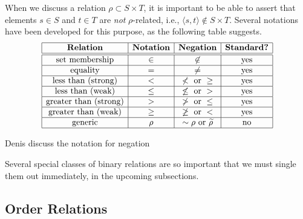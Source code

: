 \bigskip

\noindent {}
\bigskip

\noindent
When we discuss a relation $\rho \subset S \times T$, it is important
to be able to assert that elements $s \in S$ and $t \in T$ are {\em
  not} $\rho$-related, i.e., $\langle s, t
\rangle \not\in S \times T$.  Several notations have been developed
for this purpose, as the following table suggests.
\begin{equation}
\label{eq:NOT-rho-notation}
\begin{array}{|c|c|c|c|}
\hline
\mbox{\bf Relation} & \mbox{\bf Notation} & \mbox{\bf Negation} &
\mbox{\bf Standard?} \\
\hline
\hline
\mbox{set membership} & \in & \not\in & \mbox{yes} \\
\hline
\mbox{equality}       & =   & \neq    & \mbox{yes} \\
\hline
\mbox{less than (strong)} & < & \not < \mbox{ or } \geq & \mbox{yes} \\
\hline
\mbox{less than (weak)} & \leq & \not\leq \mbox{ or } > & \mbox{yes} \\
\hline
\mbox{greater than (strong)} & > & \not > \mbox{ or } \leq & \mbox{yes} \\
\hline
\mbox{greater than (weak)} & \geq & \not\geq \mbox{ or } < & \mbox{yes} \\
\hline
\mbox{generic}  & \rho  & \sim\rho \mbox{ or } \widetilde{\rho} &
\mbox{no} \\
\hline
\end{array}
\end{equation}

\medskip

{Denis discuss the notation for negation}

Several special classes of binary relations are so important that we
must single them out immediately, in the upcoming subsections.


\subsection{Order Relations}
\label{sec:order-relation}

